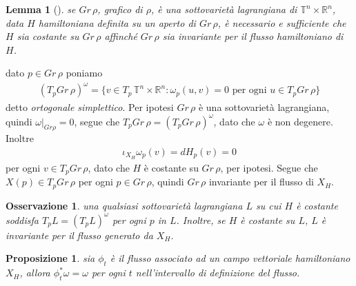\documentclass[twoside, 11pt]{amsbook}
\makeatletter
\newcommand{\0}{{(0)}}
\newcommand{\3}{{(3)}}
\theoremstyle{colonplain}
\newtheorem{prop}[thm]{Proposizione}
\newtheorem{lemma}[thm]{Lemma}
\theoremstyle{colondefinition}
\theoremstyle{colonremark}
\newtheorem{rmk}[thm]{Osservazione}
\numberwithin{equation}{chapter}
\renewcommand{\proofname}{Dimostrazione}
\renewenvironment{proof}[1][\proofname]{\par
  \pushQED{\qed}%
  \normalfont \topsep6\p@\@plus6\p@\relax
  \trivlist
  \item[\hskip\labelsep\bfseries #1:]\ignorespaces
}{%
  \popQED\endtrivlist\@endpefalse
}
\makeatother
\begin{document}
\begin{lemma}[\cite{Bost}]\label{LemBost} se $Gr \, \rho$, grafico di $\rho$, è una sottovarietà lagrangiana di $\mathbb{T}^n \times \mathbb{R}^n$, data $H$ hamiltoniana definita su un aperto di $Gr \, \rho$, è necessario e sufficiente che $H$ sia costante su $Gr \, \rho$ affinché $Gr \, \rho$ sia invariante per il flusso hamiltoniano di $H$.
\end{lemma}

\begin{proof} dato $p \in Gr \, \rho$ poniamo
\begin{align}
    (T_pGr \, \rho)^\omega = \{v \in T_p \, \mathbb{T}^n \times \mathbb{R}^n : \omega_p(u, v) = 0 \text{ per ogni } u \in T_pGr \, \rho\}
\end{align}
detto \textit{ortogonale simplettico}. Per ipotesi $Gr \, \rho$ è una sottovarietà lagrangiana, quindi $\omega|_{Gr \rho} = 0$, segue che $T_pGr \, \rho = (T_pGr \, \rho)^\omega$, dato che $\omega$ è non degenere. Inoltre
\begin{align}
    \iota_{X_H}\omega_p(v) = dH_p(v) = 0
\end{align}
per ogni $v \in T_pGr \, \rho$, dato che $H$ è costante su $Gr \, \rho$, per ipotesi. Segue che $X(p) \in T_pGr \, \rho$ per ogni $p \in Gr \, \rho$, quindi $Gr \, \rho$ invariante per il flusso di $X_H$. 
\end{proof}
\begin{rmk} una qualsiasi sottovarietà lagrangiana $L$ su cui $H$ è costante soddisfa $T_pL = (T_pL)^\omega$ per ogni $p$ in $L$. Inoltre, se $H$ è costante su $L$, $L$ è invariante per il flusso generato da $X_H$.
\end{rmk}
\begin{prop} sia $\phi_t$ è il flusso associato ad un campo vettoriale hamiltoniano $X_H$, allora $\phi^*_t\omega = \omega$ per ogni $t$ nell'intervallo di definizione del flusso.
\end{prop}
\end{document}
